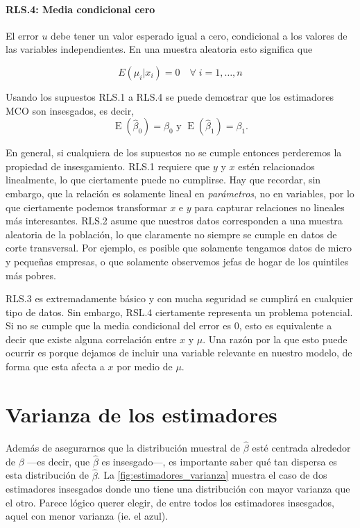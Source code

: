 \documentclass{report}\usepackage[]{graphicx}\usepackage[]{color}
\newcommand{\E}{\operatorname{E}}
\begin{document}
\paragraph{RLS.4: Media condicional cero}
El error $u$ debe tener un valor esperado igual a cero, condicional a los valores de las variables independientes. En una muestra aleatoria esto significa que

\begin{equation}
E(\mu_i | x_i) = 0 \quad \forall\; i = 1,\ldots, n
\end{equation}

Usando los supuestos RLS.1 a RLS.4 se puede demostrar que los estimadores MCO son insesgados, es decir,
\begin{equation}
\E(\hat\beta_0) = \beta_0 \text{ y } \E(\hat\beta_1) = \beta_1.
\end{equation}

En general, si cualquiera de los supuestos no se cumple entonces perderemos la propiedad de insesgamiento. RLS.1 requiere que $y$ y $x$ estén relacionados linealmente, lo que ciertamente puede no cumplirse. Hay que recordar, sin embargo, que la relación es solamente lineal en \emph{parámetros}, no en variables, por lo que ciertamente podemos transformar $x$ e $y$ para capturar relaciones no lineales más interesantes.
RLS.2 asume que nuestros datos corresponden a una muestra aleatoria de la población, lo que claramente no siempre se cumple en datos de corte transversal. Por ejemplo, es posible que solamente tengamos datos de micro y pequeñas empresas, o que solamente observemos jefas de hogar de los quintiles más pobres.

RLS.3 es extremadamente básico y con mucha seguridad se cumplirá en cualquier tipo de datos. Sin embargo, RSL.4 ciertamente representa un problema potencial. Si no se cumple que la media condicional del error es 0, esto es equivalente a decir que existe alguna correlación entre $x$ y $\mu$.
Una razón por la que esto puede ocurrir es porque dejamos de incluir una variable relevante en nuestro modelo, de forma que esta afecta a $x$ por medio de $\mu$.

\section{Varianza de los estimadores}

Además de asegurarnos que la distribución muestral de $\hat\beta$ esté centrada alrededor de $\beta$ ---es decir, que $\hat\beta$ es insesgado---, es importante saber qué tan dispersa es esta distribución de $\hat\beta$.
La \autoref{fig:estimadores_varianza} muestra el caso de dos estimadores insesgados donde uno tiene una distribución con mayor varianza que el otro.
Parece lógico querer elegir, de entre todos los estimadores insesgados, aquel con menor varianza (ie. el azul).
\end{document}
